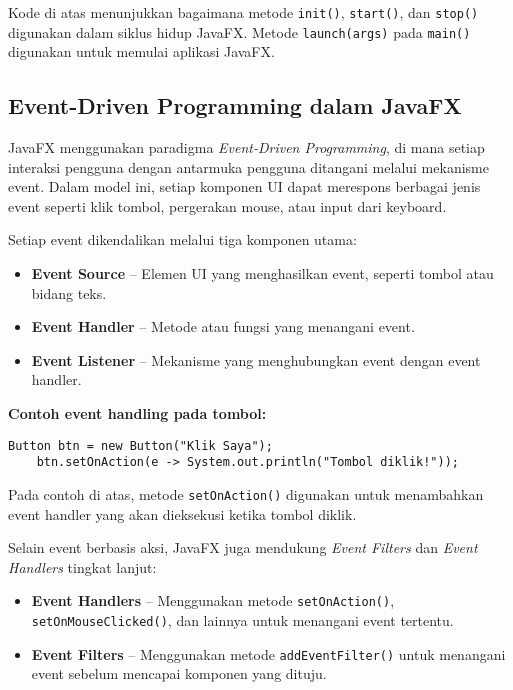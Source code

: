 Kode di atas menunjukkan bagaimana metode \texttt{init()}, \texttt{start()}, dan \texttt{stop()} digunakan dalam siklus hidup JavaFX. Metode \texttt{launch(args)} pada \texttt{main()} digunakan untuk memulai aplikasi JavaFX.

\subsection{Event-Driven Programming dalam JavaFX}

JavaFX menggunakan paradigma \textit{Event-Driven Programming}, di mana setiap interaksi pengguna dengan antarmuka pengguna ditangani melalui mekanisme event. Dalam model ini, setiap komponen UI dapat merespons berbagai jenis event seperti klik tombol, pergerakan mouse, atau input dari keyboard.

Setiap event dikendalikan melalui tiga komponen utama:
\begin{itemize}
	\item \textbf{Event Source} – Elemen UI yang menghasilkan event, seperti tombol atau bidang teks.
	\item \textbf{Event Handler} – Metode atau fungsi yang menangani event.
	\item \textbf{Event Listener} – Mekanisme yang menghubungkan event dengan event handler.
\end{itemize}

\textbf{Contoh event handling pada tombol:}
\begin{lstlisting}[style=JavaStyle, caption=Menangani event klik tombol di JavaFX]
	Button btn = new Button("Klik Saya");
	btn.setOnAction(e -> System.out.println("Tombol diklik!"));
\end{lstlisting}

Pada contoh di atas, metode \texttt{setOnAction()} digunakan untuk menambahkan event handler yang akan dieksekusi ketika tombol diklik.

Selain event berbasis aksi, JavaFX juga mendukung \textit{Event Filters} dan \textit{Event Handlers} tingkat lanjut:
\begin{itemize}
	\item \textbf{Event Handlers} – Menggunakan metode \texttt{setOnAction()}, \texttt{setOnMouseClicked()}, dan lainnya untuk menangani event tertentu.
	\item \textbf{Event Filters} – Menggunakan metode \texttt{addEventFilter()} untuk menangani event sebelum mencapai komponen yang dituju.
\end{itemize}


